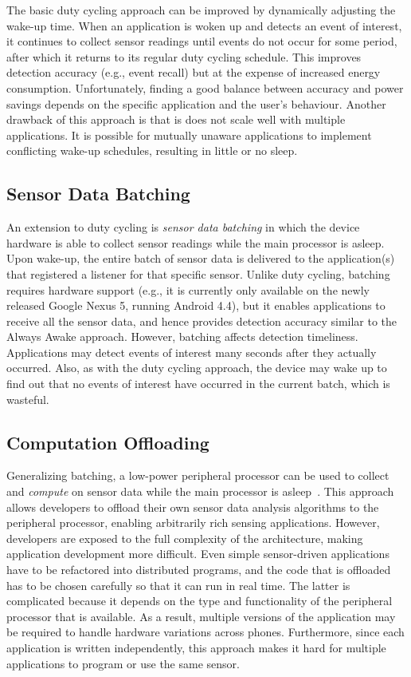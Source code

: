 The basic duty
cycling approach can be improved by dynamically adjusting the wake-up time. When
an application is woken up and detects an event of interest, it continues to
collect sensor readings until events do not occur for some period, after which
it returns to its regular duty cycling schedule. This improves detection
accuracy (e.g., event recall) but at the expense of increased energy
consumption. Unfortunately, finding a good balance between accuracy and power
savings depends on the specific application and the user's behaviour. Another
drawback of this approach is that is does not scale well with multiple
applications. It is possible for mutually unaware applications to implement
conflicting wake-up schedules, resulting in little or no sleep.

\subsection{Sensor Data Batching}

An extension to duty cycling is \emph{sensor data batching} in which
the device hardware is able to collect sensor readings while the main
processor is asleep. Upon wake-up, the entire batch of sensor data is
delivered to the application(s) that registered a listener for that
specific sensor. Unlike duty cycling, batching requires hardware
support (e.g., it is currently only available on the newly released
Google Nexus 5, running Android 4.4), but it enables applications to
receive all the sensor data, and hence provides detection accuracy
similar to the Always Awake approach. However, batching affects
detection timeliness. Applications may detect events of interest many
seconds after they actually occurred. Also, as with the duty cycling
approach, the device may wake up to find out that no events of
interest have occurred in the current batch, which is wasteful.

\subsection{Computation Offloading}
\label{subsec:computationOffloading}

Generalizing batching, a low-power peripheral processor can be used to
collect and \emph{compute} on sensor data while the main processor is
asleep~\cite{reflex,turducken}.  This approach allows developers to
offload their own sensor data analysis algorithms to the peripheral
processor, enabling arbitrarily rich sensing applications. However,
developers are exposed to the full complexity of the architecture,
making application development more difficult. Even simple
sensor-driven applications have to be refactored into distributed
programs, and the code that is offloaded has to be chosen
carefully so that it can run in real time. The latter is complicated
because it depends on the type and functionality of the peripheral
processor that is available. As a result, multiple versions of the
application may be required to handle hardware variations across
phones. Furthermore, since each application is written independently,
this approach makes it hard for multiple applications to program or
use the same sensor.

